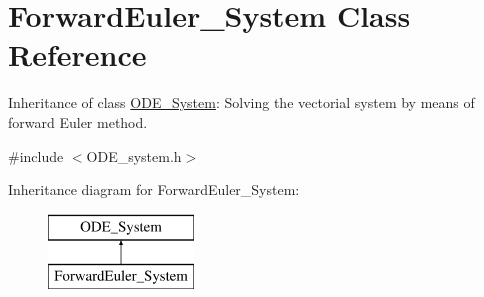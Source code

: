\hypertarget{class_forward_euler___system}{}\section{Forward\+Euler\+\_\+\+System Class Reference}
\label{class_forward_euler___system}


Inheritance of class \mbox{\hyperlink{class_o_d_e___system}{O\+D\+E\+\_\+\+System}}\+: Solving the vectorial system by means of forward Euler method.  




{\ttfamily \#include $<$O\+D\+E\+\_\+system.\+h$>$}

Inheritance diagram for Forward\+Euler\+\_\+\+System\+:\begin{figure}[H]
\begin{center}
\leavevmode
\includegraphics[height=2.000000cm]{class_forward_euler___system}
\end{center}
\end{figure}
